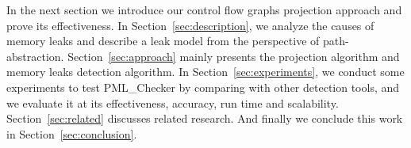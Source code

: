 In the next section we introduce our control flow graphs projection approach and prove its effectiveness. In Section~\ref{sec:description}, we analyze the causes of memory leaks and describe a leak model from the perspective of path-abstraction. Section~\ref{sec:approach} mainly presents the projection algorithm and memory leaks detection algorithm. In Section~\ref{sec:experiments}, we conduct some experiments to test PML\_Checker by comparing with other detection tools, and we evaluate it at its effectiveness, accuracy, run time and scalability. Section~\ref{sec:related} discusses related research. And finally we conclude this work in Section~\ref{sec:conclusion}.
